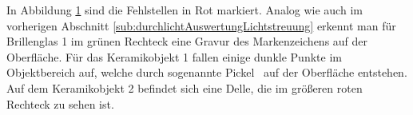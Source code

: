{
	\begin{figure}[H]
		\centering
		
		\label{tikz:abbNachbearbeitungSpLichtstreuung}
	\end{figure}
}

\noindent
In Abbildung \ref{tikz:abbNachbearbeitungSpLichtstreuung} sind die Fehlstellen in Rot markiert. 
Analog wie auch im vorherigen Abschnitt \ref{sub:durchlichtAuswertungLichtstreuung} erkennt man für Brillenglas 1 im grünen Rechteck eine Gravur des Markenzeichens auf der Oberfläche.
Für das Keramikobjekt 1 fallen einige dunkle Punkte im Objektbereich auf, welche durch sogenannte \glqq Pickel \grqq ~auf der Oberfläche entstehen.
Auf dem Keramikobjekt 2 befindet sich eine Delle, die im größeren roten Rechteck zu sehen ist.